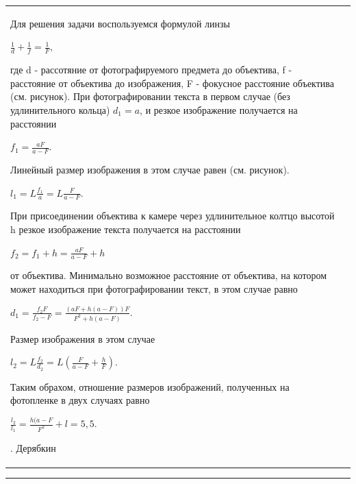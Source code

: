 \documentclass{article}
\begin{document}
\begin{tabular}{p{}p{}}
Для решения задачи воспользуемся формулой линзы
\begin{center}
    $\frac{1}{d} + \frac{1}{f} = \frac{1}{F}$,
\end{center}
где d - рассотяние от фотографируемого предмета до объектива, f - расстояние от объектива до изображения, F - фокусное расстояние объектива (см. рисунок).\newline
При фотографировании текста в первом случае (без удлинительного кольца) $d_{1}=a$, и резкое изображение получается на расстоянии
\begin{center}
    $f_{1}=\frac{aF}{a-F}$.
\end{center}
Линейный размер изображения в этом случае равен (см. рисунок).
\begin{center}
    $l_{1} = L\frac{f_{1}}{a} = L\frac{F}{a-F}$.
\end{center}
\quad При присоединении объектива к камере через удлинительное колтцо высотой h резкое изображение текста получается на расстоянии
\begin{center}
    $f_{2}=f_{1}+h=\frac{aF}{a-F}+h$
\end{center}
от объектива. Минимально возможное расстояние от объектива, на котором может находиться при фотографировании текст, в этом случае равно
\begin{center}
    $d_{1}=\frac{f_{2}F}{f_{2}-F}=\frac{(aF+h(a-F))F}{F^{2}+h(a-F)}$.
\end{center}
Размер изображения в этом случае
\begin{center}
    $l_{2}=L\frac{f_{2}}{d_{2}}=L(\frac{F}{a-F}+\frac{h}{F})$.
\end{center}
\quad Таким обрахом, отношение размеров изображений, полученных на фотопленке в двух случаях равно
\begin{center}
    $\frac{l_{2}}{l_{1}}=\frac{h(a-F}{F^{2}}+l=5,5$.
\end{center}
\begin{flushright}
    . Дерябкин
\end{flushright}
\\
\end{tabular}

\hrule
\end{document}
